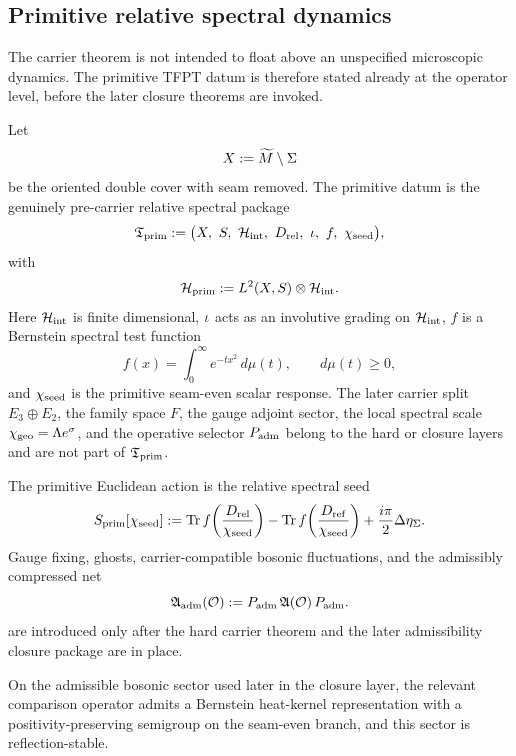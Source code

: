 \subsection{Primitive relative spectral dynamics}

The carrier theorem is not intended to float above an unspecified microscopic dynamics. The primitive TFPT datum is therefore stated already at the operator level, before the later closure theorems are invoked.

\begin{definition}
Let
\[
X:=\widetilde M\setminus \Sigma
\]
be the oriented double cover with seam removed. The primitive datum is the genuinely pre-carrier relative spectral package
\[
\mathfrak T_{\mathrm{prim}}
:=
\bigl(
X,\ S,\ \mathcal H_{\mathrm{int}},\ D_{\mathrm{rel}},\ \iota,\ f,\ \chi_{\mathrm{seed}}
\bigr),
\]
with
\[
\mathcal H_{\mathrm{prim}}
:=
L^2(X,S)\otimes \mathcal H_{\mathrm{int}}.
\]
Here $\mathcal H_{\mathrm{int}}$ is finite dimensional, $\iota$ acts as an involutive grading on $\mathcal H_{\mathrm{int}}$, $f$ is a Bernstein spectral test function
\begin{equation}
\label{eq:bernstein-test-function}
f(x)=\int_0^\infty e^{-t x^2}\,d\mu(t),
\qquad
d\mu(t)\ge 0,
\end{equation}
and $\chi_{\mathrm{seed}}$ is the primitive seam-even scalar response. The later carrier split $E_3\oplus E_2$, the family space $F$, the gauge adjoint sector, the local spectral scale $\chi_{\mathrm{geo}}=\Lambda e^\sigma$, and the operative selector $P_{\mathrm{adm}}$ belong to the hard or closure layers and are not part of $\mathfrak T_{\mathrm{prim}}$.
\end{definition}

\begin{definition}
The primitive Euclidean action is the relative spectral seed
\[
S_{\mathrm{prim}}[\chi_{\mathrm{seed}}]
:=
\operatorname{Tr} f\!\left(\frac{D_{\mathrm{rel}}}{\chi_{\mathrm{seed}}}\right)
-
\operatorname{Tr} f\!\left(\frac{D_{\mathrm{ref}}}{\chi_{\mathrm{seed}}}\right)
+\frac{i\pi}{2}\Delta\eta_\Sigma.
\]
Gauge fixing, ghosts, carrier-compatible bosonic fluctuations, and the admissibly compressed net
\[
\mathfrak A_{\mathrm{adm}}(\mathcal O):=
P_{\mathrm{adm}}\,\mathfrak A(\mathcal O)\,P_{\mathrm{adm}}.
\]
are introduced only after the hard carrier theorem and the later admissibility closure package are in place.
\end{definition}

\begin{assumption}
\label{ass:bernstein-positivity}
On the admissible bosonic sector used later in the closure layer, the relevant comparison operator admits a Bernstein heat-kernel representation with a positivity-preserving semigroup on the seam-even branch, and this sector is reflection-stable.
\end{assumption}


